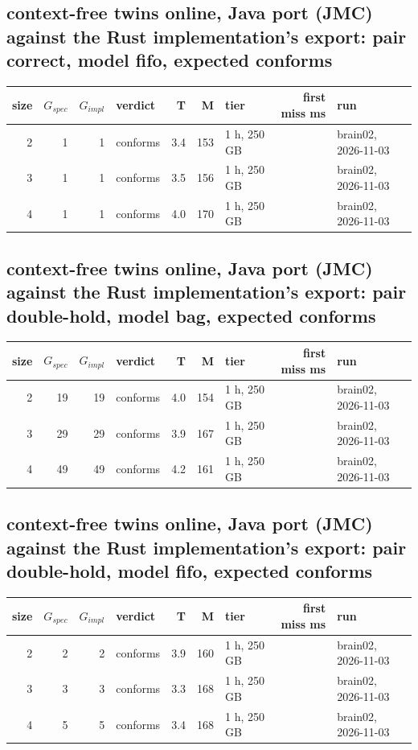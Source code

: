 \documentclass[10pt]{article}
\begin{document}
\subsection*{context-free twins online, Java port (JMC) against the Rust implementation's export: pair \textsf{correct}, model fifo, expected conforms}
\begin{longtable}{@{}rrrlrrlrl@{}}
\toprule
size & $G_{\mathit{spec}}$ & $G_{\mathit{impl}}$ & verdict & T & M & tier & first miss ms & run \\
\midrule
\endhead
\color{red} 2 & 1 & 1 & conforms & 3.4 & 153 & 1 h, 250 GB &  & brain02, 2026-11-03 \\
\color{red} 3 & 1 & 1 & conforms & 3.5 & 156 & 1 h, 250 GB &  & brain02, 2026-11-03 \\
\color{red} 4 & 1 & 1 & conforms & 4.0 & 170 & 1 h, 250 GB &  & brain02, 2026-11-03 \\
\bottomrule
\end{longtable}
\subsection*{context-free twins online, Java port (JMC) against the Rust implementation's export: pair \textsf{double-hold}, model bag, expected conforms}
\begin{longtable}{@{}rrrlrrlrl@{}}
\toprule
size & $G_{\mathit{spec}}$ & $G_{\mathit{impl}}$ & verdict & T & M & tier & first miss ms & run \\
\midrule
\endhead
\color{red} 2 & 19 & 19 & conforms & 4.0 & 154 & 1 h, 250 GB &  & brain02, 2026-11-03 \\
\color{red} 3 & 29 & 29 & conforms & 3.9 & 167 & 1 h, 250 GB &  & brain02, 2026-11-03 \\
\color{red} 4 & 49 & 49 & conforms & 4.2 & 161 & 1 h, 250 GB &  & brain02, 2026-11-03 \\
\bottomrule
\end{longtable}
\subsection*{context-free twins online, Java port (JMC) against the Rust implementation's export: pair \textsf{double-hold}, model fifo, expected conforms}
\begin{longtable}{@{}rrrlrrlrl@{}}
\toprule
size & $G_{\mathit{spec}}$ & $G_{\mathit{impl}}$ & verdict & T & M & tier & first miss ms & run \\
\midrule
\endhead
\color{red} 2 & 2 & 2 & conforms & 3.9 & 160 & 1 h, 250 GB &  & brain02, 2026-11-03 \\
\color{red} 3 & 3 & 3 & conforms & 3.3 & 168 & 1 h, 250 GB &  & brain02, 2026-11-03 \\
\color{red} 4 & 5 & 5 & conforms & 3.4 & 168 & 1 h, 250 GB &  & brain02, 2026-11-03 \\
\bottomrule
\end{longtable}
\end{document}
